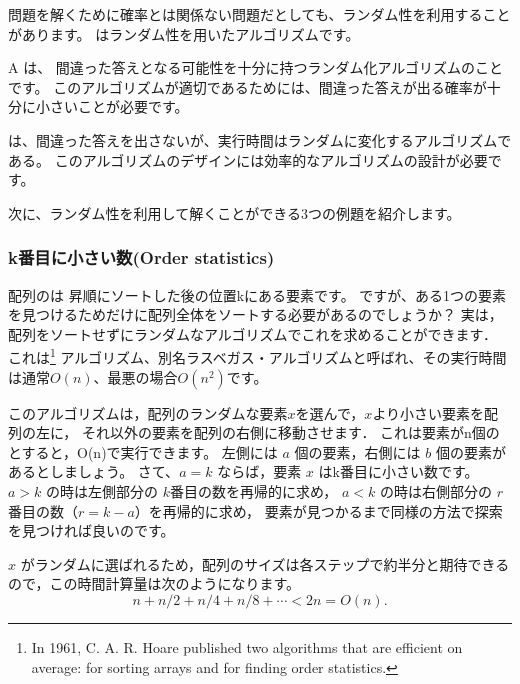 問題を解くために確率とは関係ない問題だとしても、ランダム性を利用することがあります。
はランダム性を用いたアルゴリズムです。


A  は、
間違った答えとなる可能性を十分に持つランダム化アルゴリズムのことです。
このアルゴリズムが適切であるためには、間違った答えが出る確率が十分に小さいことが必要です。


は、間違った答えを出さないが、実行時間はランダムに変化するアルゴリズムである。
このアルゴリズムのデザインには効率的なアルゴリズムの設計が必要です。

次に、ランダム性を利用して解くことができる3つの例題を紹介します。

\subsubsection{k番目に小さい数(Order statistics)}


配列のは
昇順にソートした後の位置kにある要素です。
ですが、ある1つの要素を見つけるためだけに配列全体をソートする必要があるのでしょうか？
実は，配列をソートせずにランダムなアルゴリズムでこれを求めることができます．
これは\footnote{In 1961,
C. A. R. Hoare published two algorithms that
are efficient on average:  
 \cite{hoa61a} for sorting arrays and
 \cite{hoa61b} for finding order statistics.}
アルゴリズム、別名ラスベガス・アルゴリズムと呼ばれ、その実行時間は通常$O(n)$、最悪の場合$O(n^2)$です。

このアルゴリズムは，配列のランダムな要素$x$を選んで，$x$より小さい要素を配列の左に，
それ以外の要素を配列の右側に移動させます．
これは要素がn個のとすると，O(n)で実行できます。
左側には $a$ 個の要素，右側には $b$ 個の要素があるとしましょう。
さて、$a = k$ ならば，要素 $x$ はk番目に小さい数です。
$a > k$ の時は左側部分の $k$番目の数を再帰的に求め，
$a < k$ の時は右側部分の $r$ 番目の数$（r = k - a）$を再帰的に求め，
要素が見つかるまで同様の方法で探索を見つければ良いのです。

$x$ がランダムに選ばれるため，配列のサイズは各ステップで約半分と期待できるので，この時間計算量は次のようになります。
\[n+n/2+n/4+n/8+\cdots < 2n = O(n).\]

